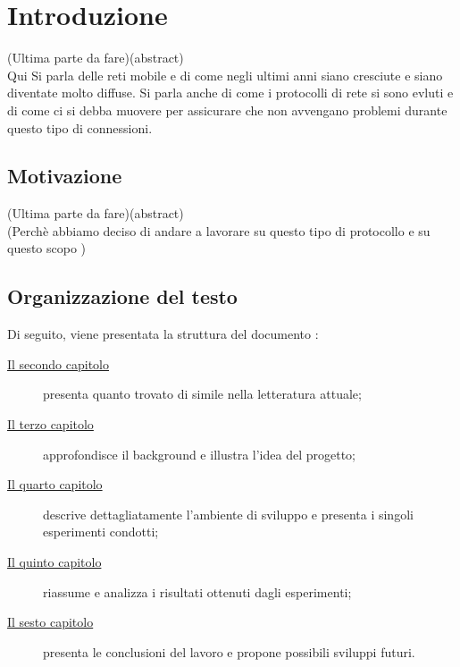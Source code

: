 \chapter{Introduzione}
\label{cap:introduzione}

(Ultima parte da fare)(abstract)\\
Qui Si parla delle reti mobile e di come negli ultimi anni siano cresciute e siano diventate molto diffuse. Si parla anche di come i protocolli di rete si sono evluti e di come ci si debba muovere per assicurare che non avvengano problemi durante questo tipo di connessioni. 


\section{Motivazione}
(Ultima parte da fare)(abstract)\\
(Perchè abbiamo deciso di andare a lavorare su questo tipo di protocollo e su questo scopo )
\section{Organizzazione del testo}

\indent Di seguito, viene presentata la struttura del documento :
\begin{description}
    \item[{\hyperref[cap:RelatedWorks]{Il secondo capitolo}}] presenta quanto trovato di simile nella letteratura attuale;

    \item[{\hyperref[cap:descrizione]{Il terzo capitolo}}] approfondisce il background e illustra l'idea del progetto;
    
    \item[{\hyperref[cap:processi-metodologie]{Il quarto capitolo}}] descrive dettagliatamente l'ambiente di sviluppo e presenta i singoli esperimenti condotti;

    \item[{\hyperref[cap:risultati]{Il quinto capitolo}}] riassume e analizza i risultati ottenuti dagli esperimenti;
    
    \item[{\hyperref[cap:conclusioni]{Il sesto capitolo}}] presenta le conclusioni del lavoro e propone possibili sviluppi futuri.
\end{description}
